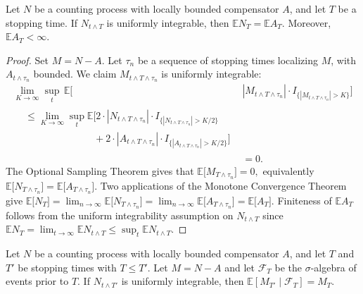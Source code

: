 \documentclass[aoas,preprint]{imsart}
\begin{document}
\begin{lemma}\label{L:expect-stopped}
    Let $N$ be a counting process with locally bounded compensator $A$, and
    let $T$ be a stopping time.  If $N_{t \wedge T}$ is uniformly integrable,
    then $\mathbb{E} N_T = \mathbb{E} A_T$.  Moreover,
    $\mathbb{E} A_T < \infty$.
\end{lemma}
\begin{proof}
    Set $M = N - A$.  Let $\tau_n$ be a sequence of stopping times
    localizing $M$, with $A_{t \wedge \tau_n}$ bounded.    We claim
    $M_{t \wedge T \wedge \tau_n}$ is uniformly integrable:
    \begin{align*}
        \lim_{K \to \infty} \sup_t \,
            \mathbb{E}\Big[
                &|M_{t \wedge T \wedge \tau_n}|
                \cdot
                I_{\{|M_{t \wedge T \wedge \tau_n}| > K\}}
            \Big] \\
        \begin{split}
        &\leq
            \lim_{K \to \infty} \sup_t
            \mathbb{E}\Big[
                2 \cdot |N_{t \wedge T \wedge \tau_n}|
                \cdot
                I_{\{|N_{t \wedge T \wedge \tau_n}| > K/2 \}} \\
                &\qquad\qquad\qquad\quad+
                2 \cdot |A_{t \wedge T \wedge \tau_n}|
                \cdot
                I_{\{|A_{t \wedge T \wedge \tau_n}| > K/2 \}}
            \Big]
        \end{split} \\
        &= 0.
    \end{align*}
    The Optional Sampling Theorem gives that
    \(
        \mathbb{E}\big[ M_{T \wedge \tau_n} \big] = 0,
    \)
    equivalently
    \(
        \mathbb{E}\big[ N_{T \wedge \tau_n} \big]
        =
        \mathbb{E}\big[ A_{T \wedge \tau_n} \big].
    \)
    Two applications of the Monotone Convergence Theorem give
    \(
        \mathbb{E}\big[ N_{T} \big]
        =
        \lim_{n \to \infty}
        \mathbb{E}\big[ N_{T \wedge \tau_n} \big]
        =
        \lim_{n \to \infty}        
        \mathbb{E}\big[ A_{T \wedge \tau_n} \big]
        =
        \mathbb{E}\big[ A_{T} \big].
    \)
    Finiteness of $\mathbb{E} A_{T}$ follows from the
    uniform integrability assumption on $N_{t \wedge T}$ since
    \(
        \mathbb{E} N_T
            = \lim_{t \to \infty} \mathbb{E} N_{t \wedge T}
            \leq \sup_t \mathbb{E} N_{t \wedge T}.
    \)
\end{proof}

\begin{lemma}
    Let $N$ be a counting process with locally bounded compensator $A$, and
    let $T$ and $T'$ be stopping times with $T \leq T'$.  Let $M = N - A$
    and let $\mathcal{F}_T$ be the $\sigma$-algebra of events prior to $T$.
    If $N_{t \wedge T'}$ is uniformly integrable,
    then $\mathbb{E} [ M_{T'} \mid \mathcal{F}_T ] = M_T$.
\end{lemma}
\end{document}
